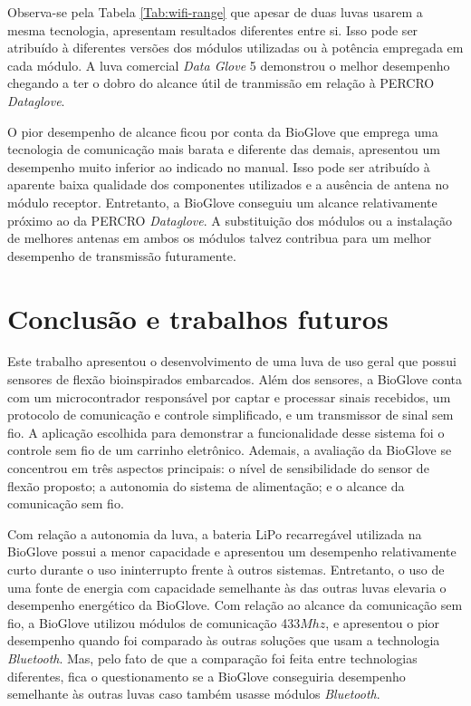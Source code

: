 \documentclass[
	12pt,				%
	openright,			%
	oneside,			%
	a4paper,			%
	english,			%
	brazil				%
	]{abntex2}
\begin{document}
			Observa-se pela Tabela \ref{Tab:wifi-range} que apesar de duas luvas usarem a mesma tecnologia, apresentam resultados diferentes entre si. Isso pode ser atribuído à diferentes versões dos módulos utilizadas ou à potência empregada em cada módulo. A luva comercial \textit{Data Glove} 5 demonstrou o melhor desempenho chegando a ter o dobro do alcance útil de tranmissão em relação à PERCRO \textit{Dataglove}.

			O pior desempenho de alcance ficou por conta da BioGlove que emprega uma tecnologia de comunicação mais barata e diferente das demais, apresentou um desempenho muito inferior ao indicado no manual. Isso pode ser atribuído à aparente baixa qualidade dos componentes utilizados e a ausência de antena no módulo receptor. Entretanto, a BioGlove conseguiu um alcance relativamente próximo ao da PERCRO \textit{Dataglove}. A substituição dos módulos ou a instalação de melhores antenas em ambos os módulos talvez contribua para um melhor desempenho de transmissão futuramente.





		\chapter{Conclusão e trabalhos futuros}
		
		Este trabalho apresentou o desenvolvimento de uma luva de uso geral que possui sensores de flexão bioinspirados embarcados. Além dos sensores, a BioGlove conta com um microcontrador responsável por captar e processar sinais recebidos, um protocolo de comunicação e controle simplificado, e um transmissor de sinal sem fio. A aplicação escolhida para demonstrar a funcionalidade desse sistema foi o controle sem fio de um carrinho eletrônico. Ademais, a avaliação da BioGlove se concentrou em três aspectos principais: o nível de sensibilidade do sensor de flexão proposto; a autonomia do sistema de alimentação; e o alcance da comunicação sem fio.

		Com relação a autonomia da luva, a bateria LiPo recarregável utilizada na BioGlove possui a menor capacidade e apresentou um desempenho relativamente curto durante o uso ininterrupto frente à outros sistemas. Entretanto, o uso de uma fonte de energia com capacidade semelhante às das outras luvas elevaria o desempenho energético da BioGlove. Com relação ao alcance da comunicação sem fio, a BioGlove utilizou módulos de comunicação 433$Mhz$, e apresentou o pior desempenho quando foi comparado às outras soluções que usam a technologia \textit{Bluetooth}. Mas, pelo fato de que a comparação foi feita entre technologias diferentes, fica o questionamento se a BioGlove conseguiria desempenho semelhante às outras luvas caso também usasse módulos \textit{Bluetooth}.
\end{document}

